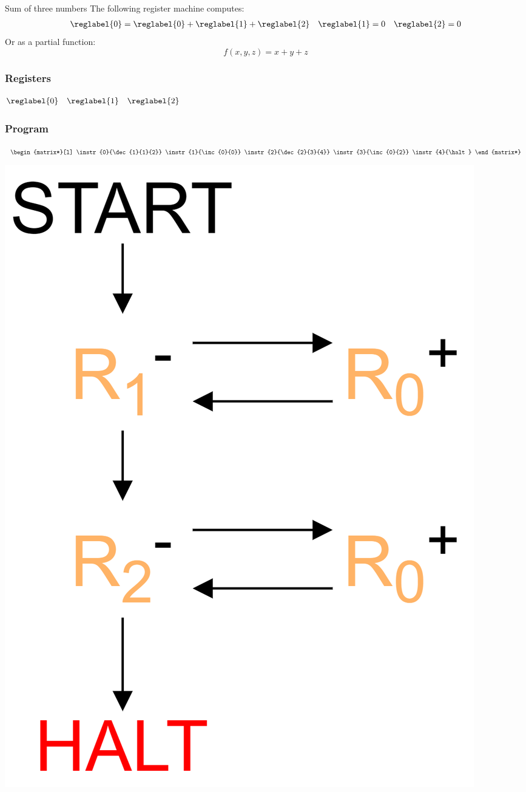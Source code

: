\begin{examplebox}{Sum of three numbers}
	The following register machine computes:
	\[\begin{matrix}
			\reglabel{0} = \reglabel{0} + \reglabel{1} + \reglabel{2} & \reglabel{1} = 0 & \reglabel{2} = 0 \\
		\end{matrix}\]
	Or as a partial function:
	\[f(x,y,z) = x + y + z\]
	\begin{minipage}{0.3\textwidth}
		\subsubsection*{Registers}
		$\begin{matrix}
				\reglabel{0} & \reglabel{1} & \reglabel{2} \\
			\end{matrix}$
		\subsubsection*{Program}
		$\begin{matrix*}[l]
				\instr{0}{\dec{1}{1}{2}}
				\instr{1}{\inc{0}{0}}
				\instr{2}{\dec{2}{3}{4}}
				\instr{3}{\inc{0}{2}}
				\instr{4}{\halt}
			\end{matrix*}$
	\end{minipage}
	\hfill
	\begin{minipage}{0.2\textwidth}
		\includegraphics[width=\textwidth]{register_machines/images/graphical_rm_example.drawio.png}
	\end{minipage}
	\hfill
	\begin{minipage}{0.3\textwidth}

\end{minipage}
\end{examplebox}
